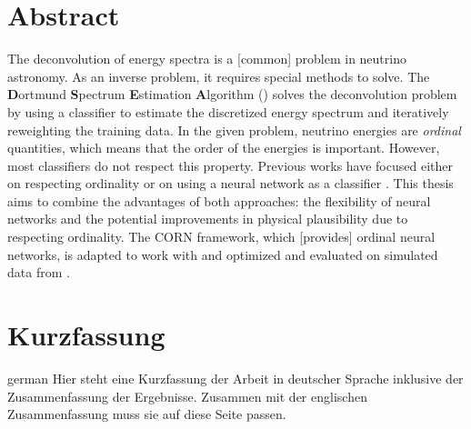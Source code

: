 \thispagestyle{plain}

\section*{Abstract}

The deconvolution of energy spectra is a [common] problem in neutrino astronomy.
As an inverse problem,
  it requires special methods to solve.
The \textbf{D}ortmund \textbf{S}pectrum \textbf{E}stimation \textbf{A}lgorithm (\dsea{}) \cite{dsea_unification}
solves the deconvolution problem
  by using a classifier to estimate the discretized energy spectrum
  and iteratively reweighting the training data.
%
In the given problem,
  neutrino energies are \emph{ordinal} quantities,
    which means that the order of the energies is important. %
However,
  most classifiers do not respect this property.
%
Previous works
have focused either
  on respecting ordinality \cite{dsea_jan}
  or on using a neural network as a classifier \cite{dsea_samuel}.
This thesis aims to combine the advantages of both approaches:
  the flexibility of neural networks
  and the potential improvements in physical plausibility
    due to respecting ordinality.
The \ac{CORN} framework,
  which [provides] ordinal neural networks,
is adapted to work with \dsea{}
and optimized and evaluated on simulated data from \icecube{}.



\section*{Kurzfassung}
\begin{foreignlanguage}{german}
Hier steht eine Kurzfassung der Arbeit in deutscher Sprache inklusive der Zusammenfassung der
Ergebnisse.
Zusammen mit der englischen Zusammenfassung muss sie auf diese Seite passen.

\blindtext[1]
\end{foreignlanguage}
